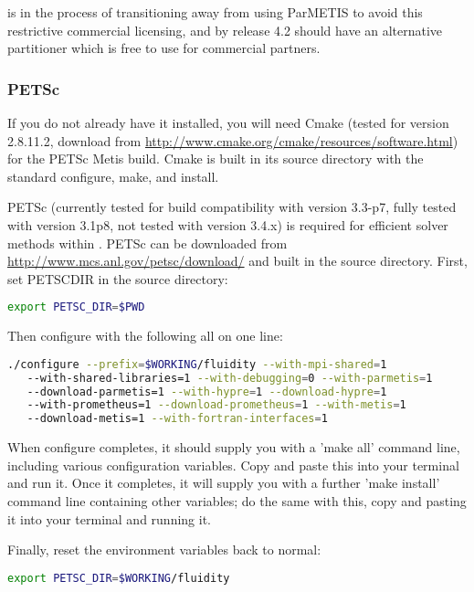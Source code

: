 \fluidity is in the process of transitioning away from using ParMETIS to avoid
this restrictive commercial licensing, and by release 4.2 should have an
alternative partitioner which is free to use for commercial partners.

\subsubsection{PETSc}
\label{sec:required_libraries_numerical_petsc}

If you do not already have it installed, you will need Cmake (tested for
version 2.8.11.2, download from
\url{http://www.cmake.org/cmake/resources/software.html}) for the PETSc Metis
build.  Cmake is built in its source directory with the standard configure,
make, and install.

PETSc (currently tested for \fluidity build compatibility with version 3.3-p7,
fully tested with version 3.1p8, not tested with version 3.4.x) is required for
efficient solver methods within \fluidity. PETSc can be downloaded from
\url{http://www.mcs.anl.gov/petsc/download/} and built in the source directory.
First, set PETSC{\textunderscore}DIR in the source directory:

\begin{lstlisting}[language=bash]
export PETSC_DIR=$PWD
\end{lstlisting}

Then configure with the following all on one line:

\begin{lstlisting}[language=bash]
./configure --prefix=$WORKING/fluidity --with-mpi-shared=1
   --with-shared-libraries=1 --with-debugging=0 --with-parmetis=1
   --download-parmetis=1 --with-hypre=1 --download-hypre=1
   --with-prometheus=1 --download-prometheus=1 --with-metis=1
   --download-metis=1 --with-fortran-interfaces=1
\end{lstlisting}

When configure completes, it should supply you with a 'make all' command line,
including various configuration variables. Copy and paste this into your
terminal and run it. Once it completes, it will supply you with a further 'make
install' command line containing other variables; do the same with this, copy
and pasting it into your terminal and running it. 

Finally, reset the environment variables back to normal:

\begin{lstlisting}[language=bash]
export PETSC_DIR=$WORKING/fluidity
\end{lstlisting}

